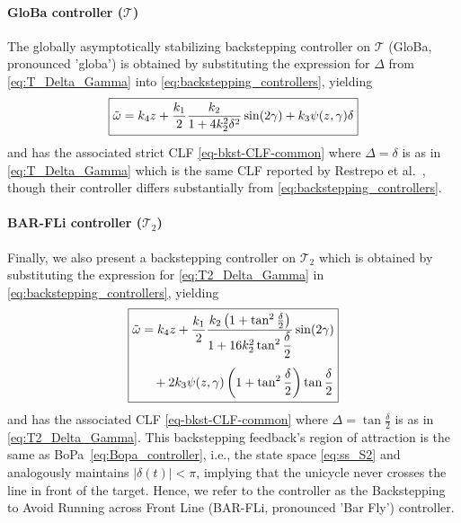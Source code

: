 \documentclass[journal,twoside,web]{ieeecolor}
\theoremstyle{definition}
\begin{document}
\paragraph{GloBa controller ($\mathcal{T}$)} The globally asymptotically stabilizing backstepping controller on $\mathcal{T}$ (GloBa, pronounced 'globa') is obtained by substituting the expression for $\Delta$ from \eqref{eq:T_Delta_Gamma} into \eqref{eq:backstepping_controllers}, yielding
\begin{equation}
\label{eq-bkst-1}
\fbox{$\tilde\omega =  k_4 z + \displaystyle \frac{k_1}{2}\frac{k_2}{1+4k_2^2 \delta^2}\sin(2\gamma) + k_3 \psi( z, \gamma)\delta$}
\end{equation}
and has the associated strict CLF \eqref{eq-bkst-CLF-common} where $\Delta = \delta$ is as in \eqref{eq:T_Delta_Gamma} which is the same CLF reported by Restrepo et al.~\cite{restrepo2020leader}, though their controller differs substantially from \eqref{eq:backstepping_controllers}. 
\paragraph{BAR-FLi controller ($\mathcal{T}_2$)} Finally, we also present a backstepping controller on $\mathcal{T}_2$ which is obtained by substituting the expression for  \eqref{eq:T2_Delta_Gamma} in \eqref{eq:backstepping_controllers}, yielding
\begin{equation}
\label{eq-bkst-3}
\fbox{$
\begin{aligned}
\tilde\omega &= k_4 z + \frac{k_1}{2} \frac{k_2 \left(1 + \tan^2 \frac{\delta}{2}\right)}{
1 + 16k_2^2 \tan^2\displaystyle\frac{\delta}{2}
} \sin(2\gamma)\\[4pt]
&\quad + 2k_3\psi(z,\gamma)
\left(1 + \tan^2\frac{\delta}{2}\right) \tan\frac{\delta}{2}
\end{aligned}
$}
\end{equation}
and has the associated CLF \eqref{eq-bkst-CLF-common} where $\Delta = \tan \frac{\delta}{2}$ is as in \eqref{eq:T2_Delta_Gamma}.
This backstepping feedback's region of attraction is the same as BoPa~\eqref{eq:Bopa_controller}, i.e., the state space \eqref{eq:ss_S2}
and analogously maintains $|\delta(t)|<\pi$, implying that the unicycle never crosses the line in front of the target. Hence, we refer to the controller as the Backstepping to Avoid Running across Front Line (BAR-FLi, pronounced 'Bar Fly') controller.
\end{document}
